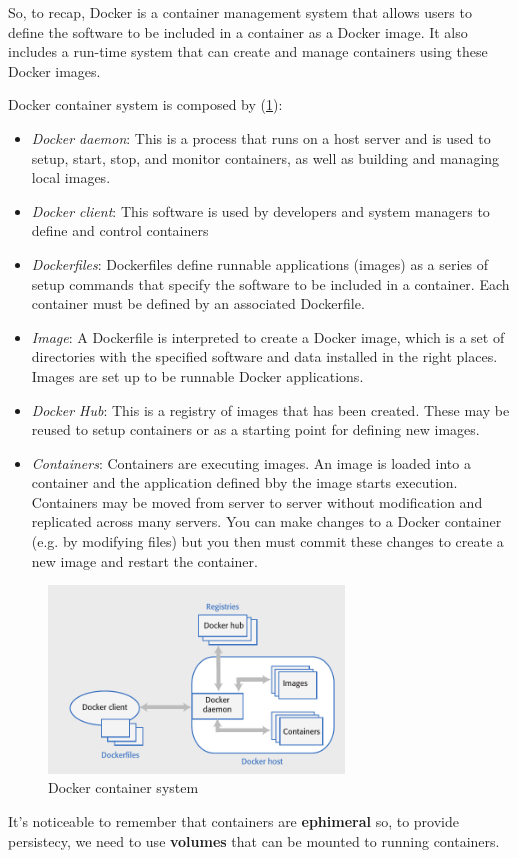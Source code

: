 \documentclass[10pt,a4paper]{report}
\begin{document}
So, to recap, Docker is a container management system that allows users to define the software to be included in a container as a Docker image. It also includes a run-time system that can create and manage
containers using these Docker images.

Docker container system is composed by (\ref{image52}):
\begin{itemize}
	\item \textit{Docker daemon}: This is a process that runs on a host server and is used to setup, start, stop, and monitor containers, as well as building and managing local images.
	\item \textit{Docker client}: This software is used by developers and system managers to define and control containers
	\item \textit{Dockerfiles}: Dockerfiles define runnable applications (images) as a series of setup commands that specify the software to be included in a container. Each container must be
	defined by an associated Dockerfile.
	\item \textit{Image}: A Dockerfile is interpreted to create a Docker image, which is a set of directories
	with the specified software and data installed in the right places. Images are set
	up to be runnable Docker applications.
	\item \textit{Docker Hub}: This is a registry of images that has been created. These may be reused to setup containers or as a starting point for defining new images.
	\item \textit{Containers}: Containers are executing images. An image is loaded into a container and the
	application defined bby the image starts execution. Containers may be moved
	from server to server without modification and replicated across many servers.
	You can make changes to a Docker container (e.g. by modifying files) but you
	then must commit these changes to create a new image and restart the
	container.
\end{itemize}

   \begin{figure}[h]
	\centering
	\includegraphics[width=0.7\textwidth]{image52}
	\caption{Docker container system}
	\label{image52}
\end{figure}
It's noticeable to remember that containers are \textbf{ephimeral} so, to provide persistecy, we need to use \textbf{volumes} that can be mounted to running containers.
\end{document}
